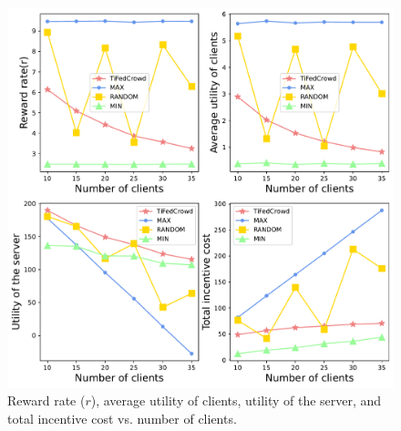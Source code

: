 \documentclass[final,1p,times]{elsarticle}
\begin{document}
\begin{figure}
	\centering
	\centerline{\includegraphics[width=5.5in]{fig4.pdf}}
	\caption{Reward rate ($r$), average utility of clients, utility of the server, and total incentive cost vs. number of clients.}
	\label{fig:4}
\end{figure}
\end{document}
